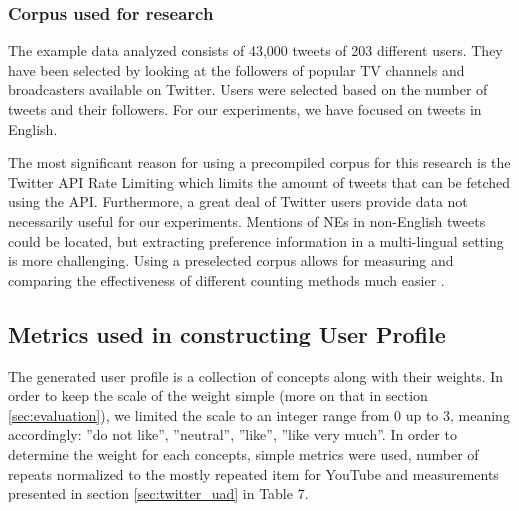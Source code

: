 \subsubsection{Corpus used for research}

The example data analyzed consists of 43,000 tweets of 203 different users.
They have been selected by looking at the followers of popular TV channels and broadcasters
available on Twitter. Users were selected based on the number of tweets and their followers.
For our experiments, we have focused on tweets in English.

The most significant reason for using a precompiled corpus for this research is the Twitter API
Rate Limiting which limits the amount of tweets that can be fetched using the API.
Furthermore, a great deal of Twitter users provide data not necessarily
useful for our experiments. Mentions of NEs in non-English tweets could be located, but
extracting preference information in a multi-lingual setting is more challenging.
Using a preselected corpus allows for measuring and comparing the effectiveness of different
counting methods much easier \cite{short-tweet}.

\subsection{Metrics used in constructing User Profile}

The generated user profile is a collection of concepts along with their
weights. In order to keep the scale of the weight simple (more on that in section
\ref{sec:evaluation}), we limited the scale to an integer range from 0
up to 3, meaning accordingly: ''do not like'', ''neutral'', ''like'', ''like
very much''. In order to determine the weight for each concepts, simple metrics
were used, \ie number of repeats normalized to the mostly repeated item for
YouTube and measurements presented in section \ref{sec:twitter_uad} in Table 7.

